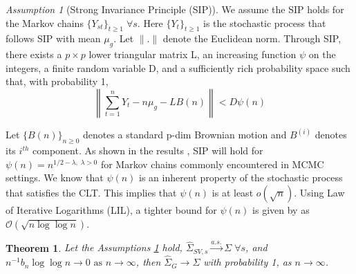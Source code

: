 \documentclass[11pt]{article}
\newtheorem{theorem}{Theorem}
\theoremstyle{remark}
\newtheorem{ass}{Assumption}
\begin{document}
\begin{ass}[Strong Invariance Principle (SIP)] \label{ass:sip}
    We assume the SIP holds for the Markov chains $\{Y_{st}\}_{t \geq 1} \; \forall s$. Here $\{Y_t\}_{t\geq 1}$ is the stochastic process that follows SIP with mean $\mu_g$. Let $\|.\|$ denote the Euclidean norm. Through SIP, there exists a $p \times p$ lower triangular matrix L, an increasing function $\psi$ on the integers, a finite random variable D, and a  sufficiently rich probability space such that, with probability 1, \\
  $$\left\|\sum_{t=1}^{n}Y_t - n\mu_g - LB(n)\right\| < D\psi(n)$$
  
  Let $\{B(n)\}_{n\geq 0}$ denotes a standard p-dim Brownian motion and $B^{(i)}$ denotes its $i^{th}$ component. As shown in the results \cite{kuelbs1980almost}, SIP will hold for $\psi(n) = n^{1/2 - \lambda, \; \lambda > 0}$ for Markov chains commonly encountered in MCMC settings. We know that $\psi(n)$ is an inherent property of the stochastic process that satisfies the CLT. This implies that $\psi(n)$ is at least $o(\sqrt{n})$. Using Law of Iterative Logarithms (LIL), a tighter bound for $\psi(n)$ is given by \cite{stra:1964} as $\mathcal{O}(\sqrt{n\log \log n})$.
\end{ass}


\begin{theorem}
\label{th:consistency}
 Let the Assumptions \ref{ass:sip} hold, $\hat{\Sigma}_{SV,s} \xrightarrow{a.s.} \Sigma \; \forall s$, and $n^{-1}{b_n \log \log n} \to 0 \textrm{ as } n \to \infty$, then $\hat{\Sigma}_{G} \to \Sigma$ with probability 1, as $n \to \infty$.
\end{theorem} 


\end{document}
